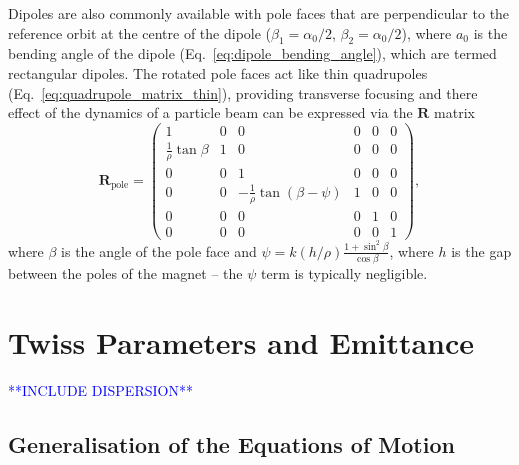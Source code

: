 \documentclass[../main.tex]{subfiles}
\begin{document}
Dipoles are also commonly available with pole faces that are perpendicular to the reference orbit at the centre of the dipole ($\beta_{1}=\alpha_{0}/2$, $\beta_{2}=\alpha_{0}/2$), where $a_{0}$ is the bending angle of the dipole (Eq.~\ref{eq:dipole_bending_angle}), which are termed rectangular dipoles. The rotated pole faces act like thin quadrupoles (Eq.~\ref{eq:quadrupole_matrix_thin}), providing transverse focusing and there effect of the dynamics of a particle beam can be expressed via the $\boldsymbol{R}$ matrix
\begin{equation}
\boldsymbol{R}_{\mathrm{pole}} =
\begin{pmatrix}
1 & 0 & 0 & 0 & 0 & 0 \\
\frac{1}{\rho}\tan\beta & 1 & 0 & 0 & 0 & 0 \\
0 & 0 & 1 & 0 & 0 & 0 \\
0 & 0 & -\frac{1}{\rho}\tan\left(\beta-\psi\right) & 1 & 0 & 0 \\
0 & 0 & 0 & 0 & 1 & 0 \\
0 & 0 & 0 & 0 & 0 & 1
\end{pmatrix},
\label{eq:pole_face_matrix}    
\end{equation}
where $\beta$ is the angle of the pole face and $\psi = k\left(h/\rho\right)\frac{1+\sin^{2}\beta}{\cos\beta}$, where $h$ is the gap between the poles of the magnet -- the $\psi$ term is typically negligible. 

\section{Twiss Parameters and Emittance}
\textcolor{blue}{**INCLUDE DISPERSION**\\}

\subsection{Generalisation of the Equations of Motion}
\end{document}
